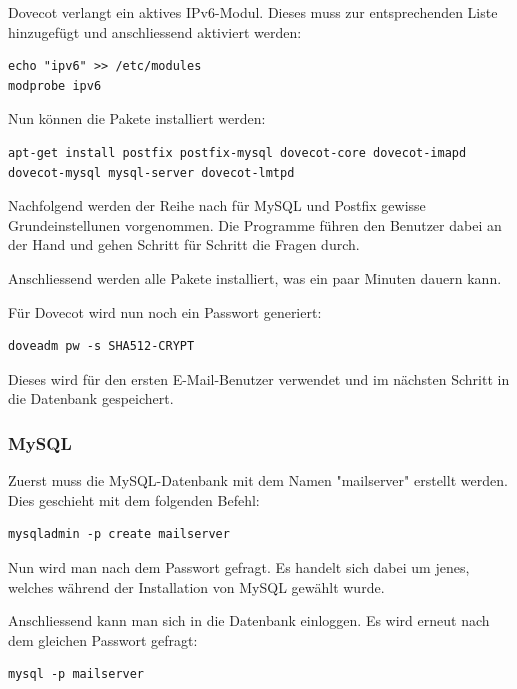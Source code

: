 Dovecot verlangt ein aktives IPv6-Modul. Dieses muss zur entsprechenden Liste hinzugefügt und anschliessend aktiviert werden:

\begin{lstlisting}
echo "ipv6" >> /etc/modules
modprobe ipv6
\end{lstlisting}

Nun können die Pakete installiert werden:

\begin{lstlisting}
apt-get install postfix postfix-mysql dovecot-core dovecot-imapd dovecot-mysql mysql-server dovecot-lmtpd
\end{lstlisting}

Nachfolgend werden der Reihe nach für MySQL und Postfix gewisse Grundeinstellunen vorgenommen. Die Programme führen den Benutzer dabei an der Hand und gehen Schritt für Schritt die Fragen durch.


Anschliessend werden alle Pakete installiert, was ein paar Minuten dauern kann. 

Für Dovecot wird nun noch ein Passwort generiert:

\begin{lstlisting}
doveadm pw -s SHA512-CRYPT
\end{lstlisting}

Dieses wird für den ersten E-Mail-Benutzer verwendet und im nächsten Schritt in die Datenbank gespeichert.

\subsubsection{MySQL}
Zuerst muss die MySQL-Datenbank mit dem Namen "mailserver" erstellt werden. Dies geschieht mit dem folgenden Befehl:

\begin{lstlisting}
mysqladmin -p create mailserver
\end{lstlisting}

Nun wird man nach dem Passwort gefragt. Es handelt sich dabei um jenes, welches während der Installation von MySQL gewählt wurde. 

Anschliessend kann man sich in die Datenbank einloggen. Es wird erneut nach dem gleichen Passwort gefragt:

\begin{lstlisting}
mysql -p mailserver
\end{lstlisting}

